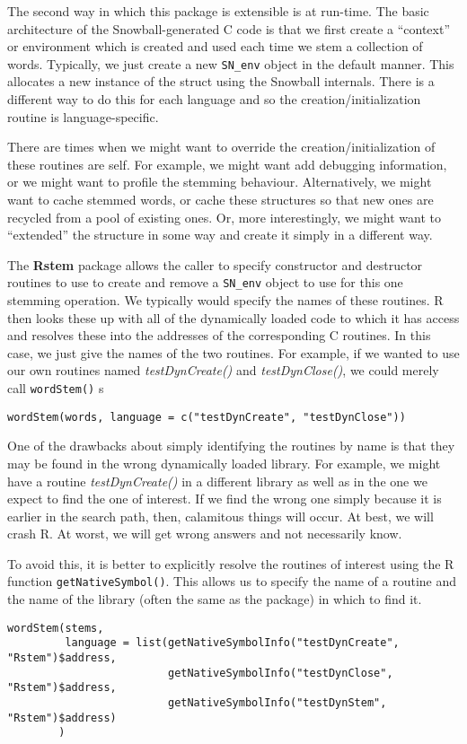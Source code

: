\documentclass{article}
\def\SFunction#1{\texttt{#1()}}
\def\SPackage#1{\textbf{#1}}
\def\Cstruct#1{\texttt{#1}}
\def\Croutine#1{\textsl{#1()}}
\begin{document}
The second way in which this package is extensible is at run-time.
The basic architecture of the Snowball-generated C code is that we
first create a ``context'' or environment which is created and used
each time we stem a collection of words.  Typically, we just create a
new \Cstruct{SN\_env} object in the default manner.  This allocates a
new instance of the struct using the Snowball internals.  There is a
different way to do this for each language and so the
creation/initialization routine is language-specific.

There are times when we might want to override the
creation/initialization of these routines are self.  For example, we
might want add debugging information, or we might want to profile the
stemming behaviour.  Alternatively, we might want to cache stemmed
words, or cache these structures so that new ones are recycled from a
pool of existing ones.  Or, more interestingly, we might want to
``extended'' the structure in some way and create it simply in a
different way.

The \SPackage{Rstem} package allows the caller to specify constructor
and destructor routines to use to create and remove a \Cstruct{SN\_env}
object to use for this one stemming operation.  We typically would
specify the names of these routines.  R then looks these up with all
of the dynamically loaded code to which it has access and resolves
these into the addresses of the corresponding C routines.  In this
case, we just give the names of the two routines.  For example, if we
wanted to use our own routines named \Croutine{testDynCreate} and
\Croutine{testDynClose},
we could merely call 
\SFunction{wordStem} s 
\begin{verbatim}
wordStem(words, language = c("testDynCreate", "testDynClose"))
\end{verbatim}

One of the drawbacks about simply identifying the routines by name is
that they may be found in the wrong dynamically loaded library.  For
example, we might have a routine \Croutine{testDynCreate} in a
different library as well as in the one we expect to find the one of
interest.  If we find the wrong one simply because it is earlier in
the search path, then, calamitous things will occur.  At best, we will
crash R. At worst, we will get wrong answers and not necessarily know.

To avoid this, it is better to explicitly resolve the routines of
interest using the R function \SFunction{getNativeSymbol}.
This allows us to specify the name of a routine and the
name of the library (often the same as the package) in which to find it.
\begin{verbatim}
wordStem(stems, 
         language = list(getNativeSymbolInfo("testDynCreate", "Rstem")$address,
                         getNativeSymbolInfo("testDynClose", "Rstem")$address,
                         getNativeSymbolInfo("testDynStem", "Rstem")$address)
        )
\end{verbatim}
\end{document}

